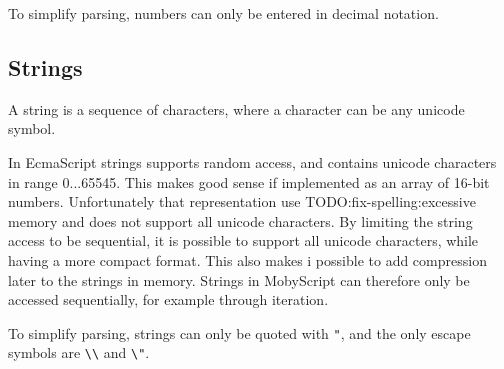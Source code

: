 To simplify parsing, numbers can only be entered in decimal notation.

\subsection{Strings}

A string is a sequence of characters, where a character can be any unicode symbol. 

In EcmaScript strings supports random access, and contains unicode characters in range 0...65545.
This makes good sense if implemented as an array of 16-bit numbers. Unfortunately that representation use TODO:fix-spelling:excessive memory and does not support all unicode characters. 
By limiting the string access to be sequential, it is possible to support all unicode characters, while having a more compact format. 
This also makes i possible to add compression later to the strings in memory.
Strings in MobyScript can therefore only be accessed sequentially, for example through iteration.

To simplify parsing, strings can only be quoted with \verb|"|, and the only escape symbols are \verb|\\| and \verb|\"|.
